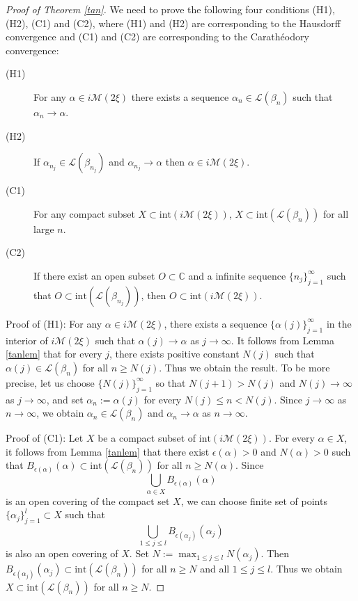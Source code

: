\documentclass[12pt]{article}
\theoremstyle{plain}
\theoremstyle{definition}
\theoremstyle{remark}
\newcommand{\C}{\mathbb C}
\newcommand{\M}{\mathcal M}
\newcommand{\LL}{\mathcal L}
\newcommand{\alp}{\alpha}
\newcommand{\fty}{\infty}
\newcommand{\ep}{\epsilon}
\newcommand{\inte}{\mathrm{int}}
\begin{document}
\begin{proof}[Proof of Theorem \ref{tan}] 
We need to prove the following four conditions (H1), (H2), (C1) and (C2), 
where 
(H1) and (H2) are corresponding to the Hausdorff convergence and 
(C1) and (C2) are corresponding to the Carath\'{e}odory  convergence: 
\begin{description}
\item[(H1)] For any $\alpha \in i  \M({2\xi})$ there exists a sequence  
$\alpha_n \in \LL(\beta_n)$ such that $\alpha_n \to \alpha$.  
\item[(H2)] If $\alpha_{n_j} \in \LL(\beta_{n_j})$ and $\alpha_{n_j} \to \alpha$ 
then $\alpha \in i\M({2\xi})$.  
\item[(C1)] For any compact subset 
$X \subset \inte(i \M({2\xi}))$, $X \subset \inte(\LL(\beta_n))$ for all large $n$. 
\item[(C2)] If there exist an open subset $O \subset \C$ 
and a infinite sequence $\{n_j\}_{j=1}^\fty$ such that 
$O \subset \inte(\LL(\beta_{n_j}))$, then $O \subset \inte(i\M({2\xi}))$. 
\end{description}

Proof of (H1):  
For any $\alp \in i\M({2\xi})$,  there exists a sequence $\{\alp(j)\}_{j =1}^\fty$ 
in the interior of $i\M({2\xi})$ such that $\alp(j) \to \alp$ as $j \to \fty$. 
It follows from Lemma \ref{tanlem} that for every $j$,  
there exists positive constant $N(j)$ such that $\alp(j) \in \LL(\beta_n)$ 
for all $n \ge N(j)$. 
Thus we obtain the result. 
To be more precise, let us choose $\{N(j)\}_{j=1}^\fty$ so  that $N(j+1)>N(j)$ and 
$N(j) \to \fty$ as $j \to \fty$, and set $\alp_n:=\alp(j)$ for every  $N(j)  \le  n  < N(j)$. 
Since $j \to \fty$ as $n \to \fty$,   
we obtain $\alp_n \in  \LL(\beta_n)$ and $\alp_n \to \alp$ as $n \to \fty$. 

\bigskip

Proof of (C1):  
Let $X$ be a compact subset of $\inte(i \M({2\xi}))$. 
For every $\alp \in X$, it follows from Lemma \ref{tanlem} that there exist $\ep(\alp)>0$ and 
$N(\alp)>0$ such that 
$B_{\ep(\alp)}(\alp) \subset \inte(\LL(\beta_n))$ 
for all $n \ge N(\alp)$. 
Since 
$$
\bigcup_{\alp \in X} B_{\ep(\alp)}(\alp)
$$
is an open covering of the compact set $X$, 
we can choose finite set of points  $\{\alp_j\}_{j=1}^l \subset X$ such that 
$$
\bigcup_{1 \le j \le l} B_{\ep(\alp_j)}(\alp_j)
$$
is also an open covering of $X$. 
Set  $N:=\max_{1 \le j \le l}{N(\alp_j)}$. 
Then 
$B_{\ep(\alp_j)}(\alp_j) \subset \inte(\LL(\beta_n))$ 
for all $n \ge N$ and all $1 \le j \le l$. 
Thus we obtain 
$X \subset \inte(\LL(\beta_n))$ for all $n \ge N$. 


\end{proof}
\end{document}
